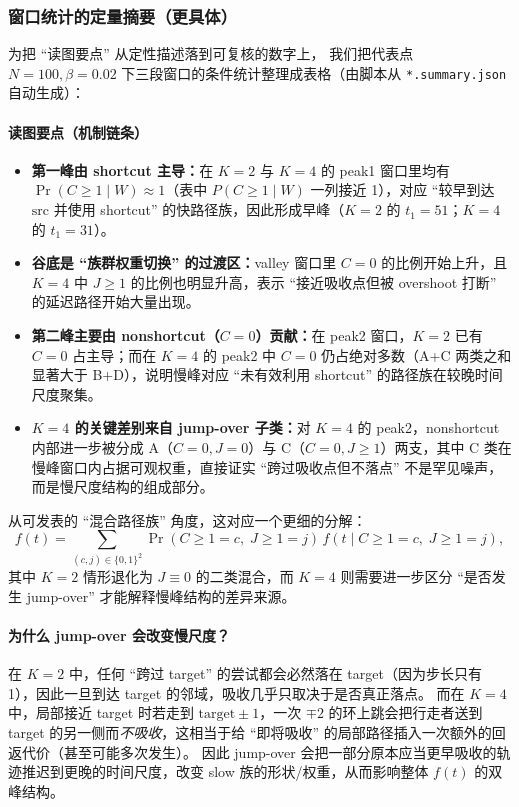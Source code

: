 \documentclass[11pt,fontset=fandol]{ctexart}
\begin{document}
\subsubsection{窗口统计的定量摘要（更具体）}
为把 ``读图要点'' 从定性描述落到可复核的数字上，
我们把代表点 $N=100,\beta=0.02$ 下三段窗口的条件统计整理成表格（由脚本从 \texttt{*.summary.json} 自动生成）：



\paragraph{读图要点（机制链条）}
\begin{itemize}
  \item \textbf{第一峰由 shortcut 主导：}在 $K=2$ 与 $K=4$ 的 peak1 窗口里均有 $\Pr(C\ge 1\mid W)\approx 1$（表中 $P(C\ge1\mid W)$ 一列接近 1），对应 ``较早到达 $\mathrm{src}$ 并使用 shortcut'' 的快路径族，因此形成早峰（$K=2$ 的 $t_1=51$；$K=4$ 的 $t_1=31$）。
  \item \textbf{谷底是 ``族群权重切换'' 的过渡区：}valley 窗口里 $C=0$ 的比例开始上升，且 $K=4$ 中 $J\ge1$ 的比例也明显升高，表示 ``接近吸收点但被 overshoot 打断'' 的延迟路径开始大量出现。
  \item \textbf{第二峰主要由 nonshortcut（$C=0$）贡献：}在 peak2 窗口，$K=2$ 已有 $C=0$ 占主导；而在 $K=4$ 的 peak2 中 $C=0$ 仍占绝对多数（A+C 两类之和显著大于 B+D），说明慢峰对应 ``未有效利用 shortcut'' 的路径族在较晚时间尺度聚集。
  \item \textbf{$K=4$ 的关键差别来自 jump-over 子类：}对 $K=4$ 的 peak2，nonshortcut 内部进一步被分成 A（$C=0,J=0$）与 C（$C=0,J\ge1$）两支，其中 C 类在慢峰窗口内占据可观权重，直接证实 ``跨过吸收点但不落点'' 不是罕见噪声，而是慢尺度结构的组成部分。
\end{itemize}
从可发表的 ``混合路径族'' 角度，这对应一个更细的分解：
\[
f(t)=\sum_{(c,j)\in\{0,1\}^2}\Pr(C\ge1=c,\;J\ge1=j)\,f(t\mid C\ge1=c,\;J\ge1=j),
\]
其中 $K=2$ 情形退化为 $J\equiv0$ 的二类混合，而 $K=4$ 则需要进一步区分 ``是否发生 jump-over'' 才能解释慢峰结构的差异来源。
\paragraph{为什么 jump-over 会改变慢尺度？}
在 $K=2$ 中，任何 ``跨过 target'' 的尝试都会必然落在 target（因为步长只有 1），因此一旦到达 target 的邻域，吸收几乎只取决于是否真正落点。
而在 $K=4$ 中，局部接近 target 时若走到 $\mathrm{target}\pm1$，一次 $\mp2$ 的环上跳会把行走者送到 target 的另一侧而\emph{不吸收}，这相当于给 ``即将吸收'' 的局部路径插入一次额外的回返代价（甚至可能多次发生）。
因此 jump-over 会把一部分原本应当更早吸收的轨迹推迟到更晚的时间尺度，改变 slow 族的形状/权重，从而影响整体 $f(t)$ 的双峰结构。
\end{document}
